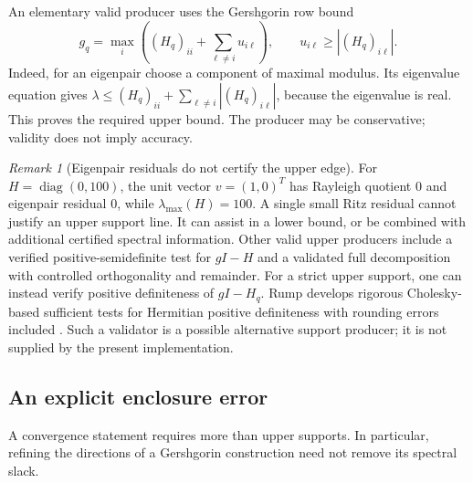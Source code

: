 \documentclass[11pt]{article}
\DeclareMathOperator{\diag}{diag}
\theoremstyle{definition}
\theoremstyle{remark}
\newtheorem{remark}[theorem]{Remark}
\numberwithin{equation}{section}
\begin{document}
An elementary valid producer uses the Gershgorin row bound
\begin{equation}\label{eq:gersh}
 g_q=\max_i\left((H_q)_{ii}+\sum_{\ell\ne i} u_{i\ell}\right),
 \qquad u_{i\ell}\ge |(H_q)_{i\ell}|.
\end{equation}
Indeed, for an eigenpair choose a component of maximal modulus. Its
eigenvalue equation gives
\(\lambda\le(H_q)_{ii}+\sum_{\ell\ne i}|(H_q)_{i\ell}|\),
because the eigenvalue is real. This proves the required upper bound.
The producer may be conservative; validity does not imply accuracy.

\begin{remark}[Eigenpair residuals do not certify the upper edge]
For \(H=\diag(0,100)\), the unit vector \(v=(1,0)^T\) has Rayleigh
quotient \(0\) and eigenpair residual \(0\), while
\(\lambda_{\max}(H)=100\). A single small Ritz residual cannot justify an
upper support line. It can assist in a lower bound, or be combined with
additional certified spectral information. Other valid upper producers
include a verified positive-semidefinite test for \(gI-H\) and a validated
full decomposition with controlled orthogonality and remainder.
For a strict upper support, one can instead verify positive definiteness
of \(gI-H_q\). Rump develops rigorous Cholesky-based sufficient tests for
Hermitian positive definiteness with rounding errors included
\citep{Rump2006}. Such a validator is a possible alternative support
producer; it is not supplied by the present implementation.

\end{remark}

\subsection{An explicit enclosure error}
A convergence statement requires more than upper supports. In particular,
refining the directions of a Gershgorin construction need not remove its
spectral slack.
\end{document}
